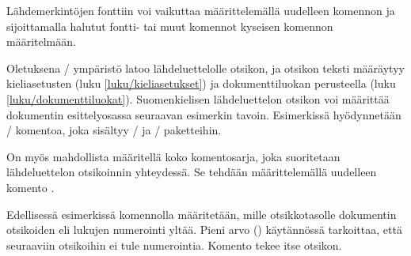 \begin{koodilohkosis}
\setlength{\parindent}{1.1em} %
\setlength{\bibhang}{\parindent}
\setlength{\bibsep}{.5ex plus .1ex minus .1ex}
\end{koodilohkosis}

\noindent
Lähdemerkintöjen fonttiin voi vaikuttaa määrittelemällä uudelleen
komennon  ja sijoittamalla halutut fontti- tai muut
komennot kyseisen komennon määritelmään.

\begin{koodilohkosis}
\renewcommand{\bibfont}{\sffamily\small}
\end{koodilohkosis}

\noindent
Oletuksena \-/ ympäristö latoo
lähdeluettelolle otsikon, ja otsikon teksti määräytyy kieliasetusten
(luku \ref{luku/kieliasetukset}) ja dokumenttiluokan perusteella (luku
\ref{luku/dokumenttiluokat}). Suomenkielisen lähdeluettelon otsikon voi
määrittää dokumentin esittelyosassa seuraavan esimerkin tavoin.
Esimerkissä hyödynnetään \-/ komentoa, joka sisältyy
\-/{} ja \-/ paketteihin.

\begin{koodilohkosis}
\addto{\captionsfinnish}{%
  \renewcommand{\refname}{Lähteet} %
  \renewcommand{\bibname}{Lähteet} %
}
\end{koodilohkosis}

\noindent
On myös mahdollista määritellä koko komentosarja, joka suoritetaan
lähdeluettelon otsikoinnin yhteydessä. Se tehdään määrittelemällä
uudelleen komento .

\begin{koodilohkosis}
\renewcommand{\bibsection}{%
  \setcounter{secnumdepth}{-1}
  \section{Lähteet}
}
\end{koodilohkosis}

\noindent
Edellisessä esimerkissä komennolla  määritetään,
mille otsikkotasolle dokumentin otsikoiden eli lukujen numerointi yltää.
Pieni arvo \mbox{()} käytännössä tarkoittaa, että seuraaviin
otsikoihin ei tule numerointia. Komento  tekee itse
otsikon.

